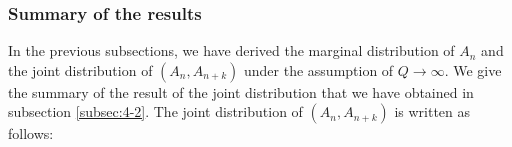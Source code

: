 \documentclass[dvipdfmx,english]{ampmt} %
\begin{document}
\subsubsection{Summary of the results}
In the previous subsections, we have derived the marginal distribution of $A_n$ and the joint distribution of $(A_n,A_{n+k})$ under the assumption of $Q\to\infty$. 
We give the summary of the result of the joint distribution that we have obtained in subsection \ref{subsec:4-2}.
The joint distribution of $(A_n,A_{n+k})$ is written as follows:
\end{document}
